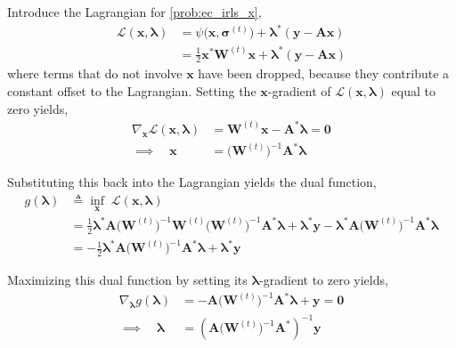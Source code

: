 \documentclass{article}
\newcommand{\m}[1]{\boldsymbol{#1}}
\begin{document}
Introduce the Lagrangian for \eqref{prob:ec_irls_x},
\begin{equation}
\begin{aligned}
\mathcal{L}(\m{x}, \m{\lambda}) &=
 \psi\big( \m{x}, \m{\sigma}^{(t)} \big) +
 \m{\lambda}^* ( \m{y} - \m{A} \m{x} )
\\ &=
 \frac{1}{2} \m{x}^* \m{W}^{(t)} \m{x} +
 \m{\lambda}^* ( \m{y} - \m{A} \m{x} )
\end{aligned}
\label{eq:lagrangian_irls_x}
\end{equation}
where terms that do not involve $\m{x}$ have been dropped, because
they contribute a constant offset to the Lagrangian. Setting the
$\m{x}$-gradient of $\mathcal{L}(\m{x}, \m{\lambda})$ equal to
zero yields,
\begin{equation}
\begin{aligned}
\nabla_{\m{x}} \mathcal{L}(\m{x}, \m{\lambda}) &=
 \m{W}^{(t)} \m{x} - \m{A}^* \m{\lambda} = \m{0}
\\ \implies\quad
\m{x} &= \big(\m{W}^{(t)}\big)^{-1} \m{A}^* \m{\lambda}
\end{aligned}
\label{eq:ec_irls_xl}
\end{equation}

Substituting this back into the Lagrangian yields the dual function,
\begin{equation}
\begin{aligned}
g(\m{\lambda}) &\triangleq
 \underset{\m{x}}{\inf} \;\mathcal{L}(\m{x}, \m{\lambda})
\\ &=
 \frac{1}{2} \m{\lambda}^* \m{A}
 \big(\m{W}^{(t)}\big)^{-1} \m{W}^{(t)}
 \big(\m{W}^{(t)}\big)^{-1} \m{A}^* \m{\lambda}
 +\m{\lambda}^* \m{y}
 -\m{\lambda}^* \m{A} \big(\m{W}^{(t)}\big)^{-1} \m{A}^* \m{\lambda}
\\ &=
 -\frac{1}{2} \m{\lambda}^* \m{A}
  \big(\m{W}^{(t)}\big)^{-1}
  \m{A}^* \m{\lambda}
 +\m{\lambda}^* \m{y}
\end{aligned}
\label{eq:ec_irls_dual}
\end{equation}

Maximizing this dual function by setting its $\m{\lambda}$-gradient
to zero yields,
\begin{equation}
\begin{aligned}
\nabla_{\m{\lambda}} g(\m{\lambda}) &=
 -\m{A} \big(\m{W}^{(t)}\big)^{-1} \m{A}^* \m{\lambda}
 +\m{y} = \m{0}
\\ \implies \quad
\m{\lambda} &=
 \left( \m{A} \big(\m{W}^{(t)}\big)^{-1} \m{A}^* \right)^{-1} \m{y}
\end{aligned}
\label{eq:ec_irls_lambda}
\end{equation}
\end{document}
